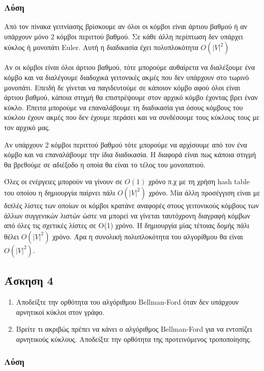 \documentclass[12pt]{report}
\newcommand{\en}[1]{\textlatin{#1}}
\begin{document}
\subsubsection*{Λύση}
Από τον πίνακα γειτνίασης βρίσκουμε αν όλοι οι κόμβοι είναι άρτιου
βαθμού ή αν υπάρχουν μόνο 2 κόμβοι περιττού βαθμού. Σε κάθε άλλη περίπτωση
δεν υπάρχει κύκλος ή μονοπάτι \en{Euler}. Αυτή η διαδικασία έχει
πολυπλοκότητα $O(|V|^2)$ 

Αν οι κόμβοι είναι όλοι άρτιου 
βαθμού, τότε μπορούμε αυθαίρετα να διαλέξουμε ένα κόμβο και να διαλέγουμε
διαδοχικά γειτονικές ακμές που δεν υπάρχουν στο τωρινό μονοπάτι. Επειδή δε
γίνεται να παγιδευτούμε σε κάποιον κόμβο αφού όλοι είναι άρτιου βαθμού,
κάποια στιγμή θα επιστρέψουμε στον αρχικό κόμβο έχοντας βρει έναν κύκλο.
Έπειτα μπορούμε να επαναλάβουμε τη διαδικασία για όσους κόμβους του
κύκλου έχουν ακμές που δεν έχουμε περάσει και να συνδέσουμε τους κύκλους
τους με τον αρχικό μας. 

Αν υπάρχουν 2 κόμβοι περιττού βαθμού τότε μπορούμε να αρχίσουμε από
τον ένα κόμβο και να επαναλάβουμε την ίδια διαδικασία. Η διαφορά είναι
πως κάποια στιγμή θα βρεθούμε σε αδιέξοδο η οποία θα είναι το τέλος
του μονοπατιού. 

Όλες οι ενέργειες μπορούν να γίνουν σε $O(1)$ χρόνο π.χ με τη χρήση
\en{hash table} του οποίου η δημιουργία παίρνει πάλι $O(|V|^2)$ χρόνο. 
Μία άλλη προσέγγιση είναι με διπλές λίστες των οποίων οι κόμβοι κρατάνε
αναφορές στους γειτονικούς κόμβους των άλλων συγγενικών λιστών ώστε 
να μπορεί να γίνεται ταυτόχρονη διαγραφή κόμβων από όλες τις σχετικές
λίστες σε O(1) χρόνο. Η δημιουργία μίας τέτοιας δομής πάλι θέλει $O(|V|^2)$
χρόνο. 
Άρα η συνολική πολυπλοκότητα του αλγορίθμου θα είναι $O(|V|^2)$.
 

\newpage\subsection*{Άσκηση 4}
\begin{enumerate}
\item
Αποδείξτε την ορθότητα του αλγόριθμου \en{Bellman-Ford} όταν δεν υπάρχουν 
αρνητικοί κύκλοι στον γράφο.

\item
Βρείτε τι ακριβώς πρέπει να κάνει ο αλγόριθμος \en{Bellman-Ford} για
να εντοπίζει αρνητικούς κύκλους. Αποδείξτε την ορθότητα της προτεινόμενος
τροποποίησης.
\end{enumerate}

\subsubsection*{Λύση}
\end{document}
